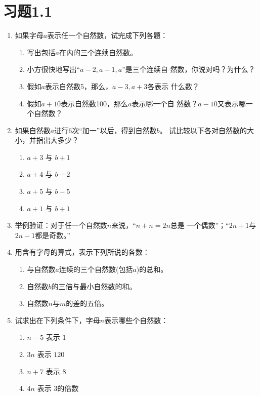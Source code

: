 \section*{习题1.1}

\begin{enumerate}
	\item 如果字母$a$表示任一个自然数，试完成下列各题：
	\begin{enumerate}
		\item 写出包括$a$在内的三个连续自然数。
		\item 小方很快地写出“$a-2, a-1, a$”是三个连续自
		然数，你说对吗？为什么？
		\item 假如$a$表示自然数5，那么，$a-3,a+3$各表示
		什么数？
		\item 假如$a+10$表示自然数100，那么$a$表示哪一个自
		然数？$a-10$又表示哪一个自然数？
		
	\end{enumerate}
	
	\item  如果自然数$a$进行6次“加一”以后，得到自然数$b$。
	试比较以下各对自然数的大小，并指出大多少？
	\begin{multicols}{2}
		\begin{enumerate}
			\item $a+3$ 与 $b+1$
			\item $a+4$ 与 $b-2$
			\item $a+5$ 与 $b-5$
			\item $a+1$ 与 $b+1$
		\end{enumerate}
	\end{multicols}
	
	\item  举例验证：对于任一个自然数$n$来说，“$n+n=2n$总是
	一个偶数”；“$2n + 1$与$2n-1$都是奇数。”
	
	\item 用含有字母的算式，表示下列所说的各数：
	\begin{enumerate}
		\item 与自然数$a$连续的三个自然数(包括$a$)的总和。
		\item 自然数$b$的三倍与最小自然数的和。
		\item 自然数$n$与$m$的差的五倍。
	\end{enumerate}
	
	\item 试求出在下列条件下，字母$n$表示哪些个自然数：
	\begin{enumerate}
		\item  $n-5$ 表示 $1$
		\item  $3n$ 表示 $120$
		\item  $n+7$ 表示 $8$
		\item  $4n$ 表示 $3$的倍数
	\end{enumerate}
	

\end{enumerate}
